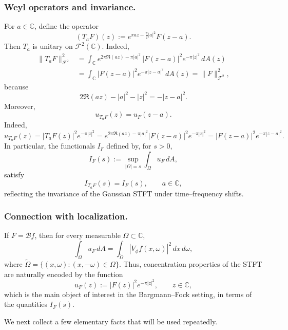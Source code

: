 \documentclass[a4paper,11pt,reqno]{amsart}
\numberwithin{equation}{section}
\theoremstyle{plain} %
\theoremstyle{definition} %
\theoremstyle{remark}
\newcommand{\C}{\mathbb{C}}
\begin{document}
\medskip

\noindent
\subsubsection*{Weyl operators and invariance.}
For $a \in \mathbb{C}$, define the operator
\begin{equation}\label{eq:Ta}
(T_a F)(z) := e^{\pi a z - \frac{\pi}{2}|a|^2} F(z - a).
\end{equation}
Then $T_a$ is unitary on $\mathcal{F}^2(\mathbb{C})$. Indeed,
\begin{align*}
\|T_aF\|_{\mathcal F^2}^2
&=
\int_{\C} e^{2\pi \Re(az)-\pi |a|^2}\,|F(z-a)|^2 e^{-\pi |z|^2}\,dA(z) \\
&=
\int_{\C} |F(z-a)|^2 e^{-\pi |z-a|^2}\,dA(z)
=
\|F\|_{\mathcal F^2}^2,
\end{align*}
because
\[
2\Re(az)-|a|^2-|z|^2=-|z-a|^2.
\]
Moreover,
\begin{equation}\label{eq:uF-translate}
u_{T_a F}(z) = u_F(z - a).
\end{equation}
Indeed,
\[
u_{T_aF}(z)
=
|T_aF(z)|^2e^{-\pi |z|^2}
=
e^{2\pi\Re(az)-\pi|a|^2}|F(z-a)|^2e^{-\pi |z|^2}
=
|F(z-a)|^2e^{-\pi |z-a|^2}.
\]
In particular, the functionals $I_F$ defined by, 
for \(s>0\),
\[
I_F(s):=\sup_{|\Omega|=s}\int_\Omega u_F\,dA,
\]
satisfy
\[
I_{T_a F}(s) = I_F(s), \qquad a \in \mathbb{C},
\]
reflecting the invariance of the Gaussian STFT under time--frequency shifts.

\medskip

\noindent
\subsubsection*{Connection with localization.}
If $F = \mathcal{B}f$, then for every measurable $\Omega \subset \mathbb{C}$,
\[
\int_\Omega u_F \, dA
= \int_{\widetilde{\Omega}} |V_\phi f(x,\omega)|^2 \, dx\, d\omega,
\]
where $\widetilde{\Omega} = \{(x,\omega) : (x,-\omega) \in \Omega\}$.
Thus, concentration properties of the STFT are naturally encoded by the function
\begin{equation}\label{eq:uF}
u_F(z) := |F(z)|^2 e^{-\pi |z|^2}, \qquad z \in \mathbb{C},
\end{equation}
which is the main object of interest in the Bargmann--Fock setting, in terms of the
quantities $I_F(s)$.

\medskip

We next collect a few elementary facts that will be used repeatedly.
\end{document}
